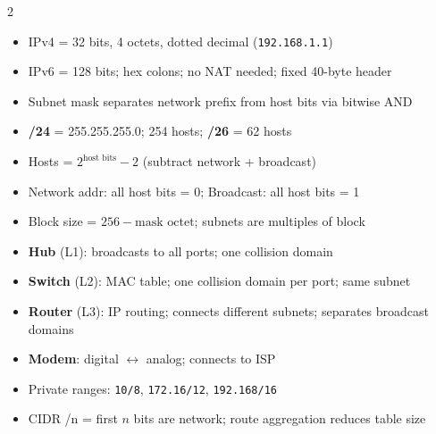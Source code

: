 \documentclass[11pt, letterpaper]{article}
\begin{document}
\begin{tcolorbox}[colback=partbg, colframe=sectionblue,
  title={\bfseries IP Addressing, Subnetting \& Network Devices}, arc=3pt, boxrule=1pt]
\footnotesize
\begin{multicols}{2}
\begin{itemize}[noitemsep, leftmargin=*]
  \item IPv4 = 32 bits, 4 octets, dotted decimal (\texttt{192.168.1.1})
  \item IPv6 = 128 bits; hex colons; no NAT needed; fixed 40-byte header
  \item Subnet mask separates network prefix from host bits via bitwise AND
  \item \textbf{/24} = 255.255.255.0; 254 hosts; \textbf{/26} = 62 hosts
  \item Hosts = $2^{\text{host bits}} - 2$ (subtract network + broadcast)
  \item Network addr: all host bits = 0; Broadcast: all host bits = 1
  \item Block size = $256 - \text{mask octet}$; subnets are multiples of block
\end{itemize}
\columnbreak
\begin{itemize}[noitemsep, leftmargin=*]
  \item \textbf{Hub} (L1): broadcasts to all ports; one collision domain
  \item \textbf{Switch} (L2): MAC table; one collision domain per port; same subnet
  \item \textbf{Router} (L3): IP routing; connects different subnets; separates broadcast domains
  \item \textbf{Modem}: digital $\leftrightarrow$ analog; connects to ISP
  \item Private ranges: \texttt{10/8}, \texttt{172.16/12}, \texttt{192.168/16}
  \item CIDR /n = first $n$ bits are network; route aggregation reduces table size
\end{itemize}
\end{multicols}
\end{tcolorbox}

\vspace{4pt}
\end{document}

